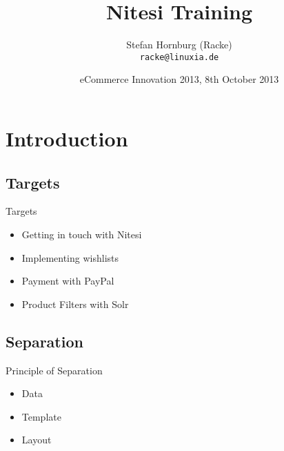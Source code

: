 \usepackage[utf8]{inputenc}
\usepackage[T1]{fontenc}
\usepackage{mathptmx}
\usepackage[scaled=.90]{helvet}
\usepackage{courier}
\usepackage{caption}
\captionsetup{labelformat=empty,labelsep=none}
\usepackage{beamerthemesplit}
\usepackage{verbatim}
\usepackage{hyperref}
\usepackage{listings}
\lstset{language=Perl,basicstyle=\normalsize,tabsize=3,showstringspaces=false}

\title{Nitesi Training}
\author[racke]{Stefan Hornburg (Racke)\\ \texttt{racke@linuxia.de}}
\date{eCommerce Innovation 2013, 8th October 2013}


\maketitle{}

\begin{frame}
  \titlepage
\end{frame}

\tableofcontents

\section{Introduction}

\subsection{Targets}
\begin{frame}{Targets}
\begin{itemize}
\item Getting in touch with Nitesi
\item Implementing wishlists
\item Payment with PayPal
\item Product Filters with Solr
\end{itemize}
\end{frame}

\subsection{Separation}
\begin{frame}{Principle of Separation}
\begin{itemize}
\item Data
\item Template
\item Layout
\end{itemize}
\end{frame}

